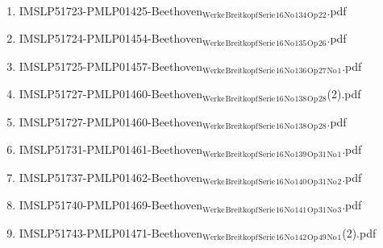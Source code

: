 \documentclass[11pt]{article}
\begin{document}
\begin{enumerate}
\begin{enumerate}
\begin{enumerate}
\item IMSLP51723-PMLP01425-Beethoven$_{\text{Werke}}$$_{\text{Breitkopf}}$$_{\text{Serie}}$$_{\text{16}}$$_{\text{No}}$$_{\text{134}}$$_{\text{Op}}$$_{\text{22}}$.pdf
\label{sec-1-1-1-1-44-9-6-7-61}

\item IMSLP51724-PMLP01454-Beethoven$_{\text{Werke}}$$_{\text{Breitkopf}}$$_{\text{Serie}}$$_{\text{16}}$$_{\text{No}}$$_{\text{135}}$$_{\text{Op}}$$_{\text{26}}$.pdf
\label{sec-1-1-1-1-44-9-6-7-62}

\item IMSLP51725-PMLP01457-Beethoven$_{\text{Werke}}$$_{\text{Breitkopf}}$$_{\text{Serie}}$$_{\text{16}}$$_{\text{No}}$$_{\text{136}}$$_{\text{Op}}$$_{\text{27}}$$_{\text{No}}$$_{\text{1}}$.pdf
\label{sec-1-1-1-1-44-9-6-7-63}

\item IMSLP51727-PMLP01460-Beethoven$_{\text{Werke}}$$_{\text{Breitkopf}}$$_{\text{Serie}}$$_{\text{16}}$$_{\text{No}}$$_{\text{138}}$$_{\text{Op}}$$_{\text{28}}$(2).pdf
\label{sec-1-1-1-1-44-9-6-7-64}

\item IMSLP51727-PMLP01460-Beethoven$_{\text{Werke}}$$_{\text{Breitkopf}}$$_{\text{Serie}}$$_{\text{16}}$$_{\text{No}}$$_{\text{138}}$$_{\text{Op}}$$_{\text{28}}$.pdf
\label{sec-1-1-1-1-44-9-6-7-65}

\item IMSLP51731-PMLP01461-Beethoven$_{\text{Werke}}$$_{\text{Breitkopf}}$$_{\text{Serie}}$$_{\text{16}}$$_{\text{No}}$$_{\text{139}}$$_{\text{Op}}$$_{\text{31}}$$_{\text{No}}$$_{\text{1}}$.pdf
\label{sec-1-1-1-1-44-9-6-7-66}

\item IMSLP51737-PMLP01462-Beethoven$_{\text{Werke}}$$_{\text{Breitkopf}}$$_{\text{Serie}}$$_{\text{16}}$$_{\text{No}}$$_{\text{140}}$$_{\text{Op}}$$_{\text{31}}$$_{\text{No}}$$_{\text{2}}$.pdf
\label{sec-1-1-1-1-44-9-6-7-67}

\item IMSLP51740-PMLP01469-Beethoven$_{\text{Werke}}$$_{\text{Breitkopf}}$$_{\text{Serie}}$$_{\text{16}}$$_{\text{No}}$$_{\text{141}}$$_{\text{Op}}$$_{\text{31}}$$_{\text{No}}$$_{\text{3}}$.pdf
\label{sec-1-1-1-1-44-9-6-7-68}

\item IMSLP51743-PMLP01471-Beethoven$_{\text{Werke}}$$_{\text{Breitkopf}}$$_{\text{Serie}}$$_{\text{16}}$$_{\text{No}}$$_{\text{142}}$$_{\text{Op}}$$_{\text{49}}$$_{\text{No}}$$_{\text{1}}$(2).pdf
\label{sec-1-1-1-1-44-9-6-7-69}


\end{enumerate}
\end{enumerate}
\end{enumerate}
\end{document}
